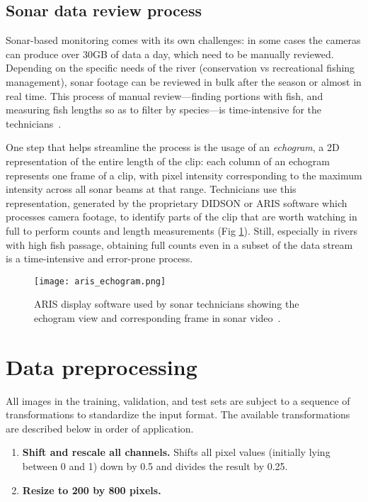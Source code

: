 \subsection{Sonar data review process}

Sonar-based monitoring comes with its own challenges: in some cases the cameras can produce over 30GB of data a day, which need to be manually reviewed. Depending on the specific needs of the river (\eg conservation vs recreational fishing management), sonar footage can be reviewed in bulk after the season or almost in real time. This process of manual review---finding portions with fish, and measuring fish lengths so as to filter by species---is time-intensive for the technicians~\cite{AlaskaSonar}.

One step that helps streamline the process is the usage of an \textit{echogram}, a 2D representation of the entire length of the clip: each column of an echogram represents one frame of a clip, with pixel intensity corresponding to the maximum intensity across all sonar beams at that range. Technicians use this representation, generated by the proprietary DIDSON or ARIS software which processes camera footage, to identify parts of the clip that are worth watching in full to perform counts and length measurements (Fig \ref{fig:aris}). Still, especially in rivers with high fish passage, obtaining full counts even in a subset of the data stream is a time-intensive and error-prone process.

\begin{figure}[b]
  \centering
  \texttt{[image: aris\_echogram.png]}
  \caption{ARIS display software used by sonar technicians showing the echogram view and corresponding frame in sonar video~\cite{Key2017}.
  }
  \label{fig:aris}
\end{figure}


\section{Data preprocessing}

All images in the training, validation, and test sets are subject to a sequence of transformations to standardize the input format. The available transformations are described below in order of application.

\begin{enumerate}
    \item \textbf{Shift and rescale all channels.} Shifts all pixel values (initially lying between 0 and 1) down by 0.5 and divides the result by 0.25.
    \item \textbf{Resize to 200 by 800 pixels.}
\end{enumerate}